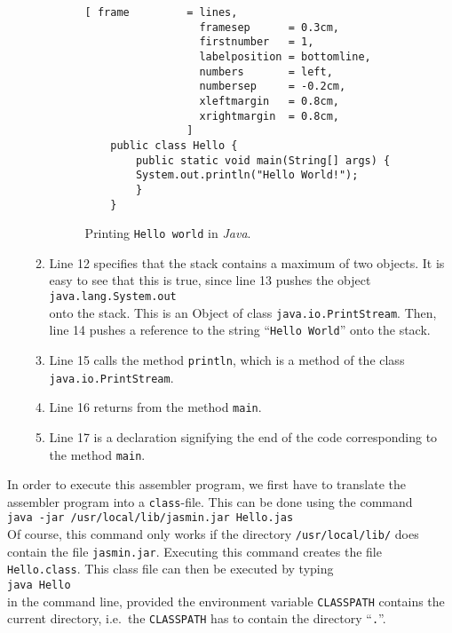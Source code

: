 \begin{enumerate}
\begin{enumerate}
\begin{figure}[!ht]
\centering
\begin{Verbatim}[ frame         = lines, 
                  framesep      = 0.3cm, 
                  firstnumber   = 1,
                  labelposition = bottomline,
                  numbers       = left,
                  numbersep     = -0.2cm,
                  xleftmargin   = 0.8cm,
                  xrightmargin  = 0.8cm,
                ]
    public class Hello {
        public static void main(String[] args) {
    	System.out.println("Hello World!");
        }
    }
\end{Verbatim}
\vspace*{-0.3cm}
\caption{Printing \texttt{Hello world} in \textsl{Java}.} 
\label{fig:Hello.java}
\end{figure}

  \item Line 12 specifies that the stack contains a maximum of two objects.  It is easy to see that
        this is true, since line 13 pushes the object
        \\[0.2cm]
        \hspace*{1.3cm}
        \texttt{java.lang.System.out}
        \\[0.2cm]
        onto the stack.  This is an Object of class \texttt{java.io.PrintStream}.
        Then, line 14 pushes a reference to the string ``\texttt{Hello World}'' onto the stack.
  \item Line 15 calls the method \texttt{println}, which is a method of the class
        \texttt{java.io.PrintStream}.  
  \item Line 16 returns from the method \texttt{main}.
  \item Line 17 is a declaration signifying the end of the code corresponding to the method 
        \texttt{main}.
  \end{enumerate}
\end{enumerate}
In order to execute this assembler program, we first have to translate the assembler program into a
\texttt{class}-file.  This can be done using the command
\\[0.2cm]
\hspace*{1.3cm}
\texttt{java -jar /usr/local/lib/jasmin.jar Hello.jas}
\\[0.2cm]
Of course, this command only works if the directory \texttt{/usr/local/lib/} does contain the file
\texttt{jasmin.jar}.  Executing this command creates the file \texttt{Hello.class}.  This class file
can then be executed by typing
\\[0.2cm]
\hspace*{1.3cm}
\texttt{java Hello}
\\[0.2cm]
in the command line, provided the environment variable \texttt{CLASSPATH} contains the current
directory, i.e.~the \texttt{CLASSPATH} has to contain the directory ``\texttt{.}''.

